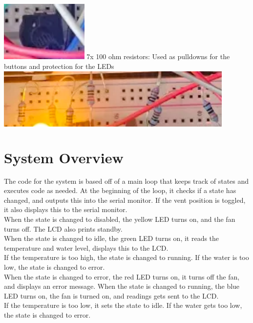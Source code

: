 \documentclass{article}
\begin{document}
\includegraphics[height=30mm]{potentiometer.png}\newpage
7x 100 ohm resistors: Used as pulldowns for the buttons and protection for the LEDs\\
\includegraphics[height=30mm]{ohmresistors.png}\\
\section{System Overview}
The code for the system is based off of a main loop that keeps track of states and executes code as needed. 
At the beginning of the loop, it checks if a state has changed, and outputs this into the serial monitor. If the vent position is toggled, it also displays this to the serial monitor.\\
When the state is changed to disabled, the yellow LED turns on, and the fan turns off. The LCD also prints standby.\\
When the state is changed to idle, the green LED turns on, it reads the temperature and water level, displays this to the LCD.\\
If the temperature is too high, the state is changed to running. If the water is too low, the state is changed to error.\\
When the state is changed to error, the red LED turns on, it turns off the fan, and displays an error message.
When the state is changed to running, the blue LED turns on, the fan is turned on, and readings gets sent to the LCD.\\
If the temperature is too low, it sets the state to idle. If the water gets too low, the state is changed to error.\\
\end{document}
